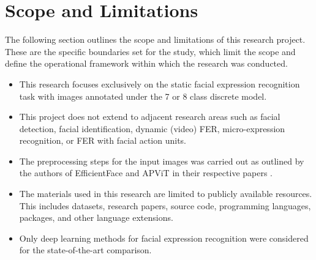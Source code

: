 \section{Scope and Limitations}\label{section:scope-limitations}

The following section outlines the scope and limitations of this research project. These are the specific boundaries set for the study, which limit the scope and define the operational framework within which the research was conducted. 

\begin{itemize} 

\item This research focuses exclusively on the static facial expression recognition task with images annotated under the 7 or 8 class discrete model.

\item This project does not extend to adjacent research areas such as facial detection, facial identification, dynamic (video) FER, micro-expression recognition, or FER with facial action units.

\item The preprocessing steps for the input images was carried out as outlined by the authors of EfficientFace and APViT in their respective papers \cite{eff-face2021, apvit2023}.

\item The materials used in this research are limited to publicly available resources. This includes datasets, research papers, source code, programming languages,  packages, and other language extensions.

\item Only deep learning methods for facial expression recognition were considered for the state-of-the-art comparison.

\end{itemize}